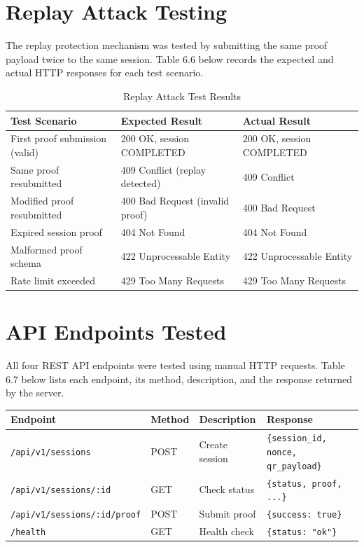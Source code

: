 \section{Replay Attack Testing}

The replay protection mechanism was tested by submitting the same proof payload twice to the same session. Table 6.6 below records the expected and actual HTTP responses for each test scenario.

\begin{table}[H]
\centering
\caption{Replay Attack Test Results}
\begin{tabular}{|l|l|l|}
\hline
\textbf{Test Scenario} & \textbf{Expected Result} & \textbf{Actual Result} \\
\hline
First proof submission (valid) & 200 OK, session COMPLETED & 200 OK, session COMPLETED \\
Same proof resubmitted & 409 Conflict (replay detected) & 409 Conflict \\
Modified proof resubmitted & 400 Bad Request (invalid proof) & 400 Bad Request \\
Expired session proof & 404 Not Found & 404 Not Found \\
Malformed proof schema & 422 Unprocessable Entity & 422 Unprocessable Entity \\
Rate limit exceeded & 429 Too Many Requests & 429 Too Many Requests \\
\hline
\end{tabular}
\end{table}

\section{API Endpoints Tested}

All four REST API endpoints were tested using manual HTTP requests. Table 6.7 below lists each endpoint, its method, description, and the response returned by the server.

\begin{table}[H]
\begin{tabular}{|l|l|l|l|}
\hline
\textbf{Endpoint} & \textbf{Method} & \textbf{Description} & \textbf{Response} \\
\hline
\texttt{/api/v1/sessions} & POST & Create session & \texttt{\{session\_id, nonce, qr\_payload\}} \\
\texttt{/api/v1/sessions/:id} & GET & Check status & \texttt{\{status, proof, ...\}} \\
\texttt{/api/v1/sessions/:id/proof} & POST & Submit proof & \texttt{\{success: true\}} \\
\texttt{/health} & GET & Health check & \texttt{\{status: "ok"\}} \\
\hline
\end{tabular}
\end{table}

